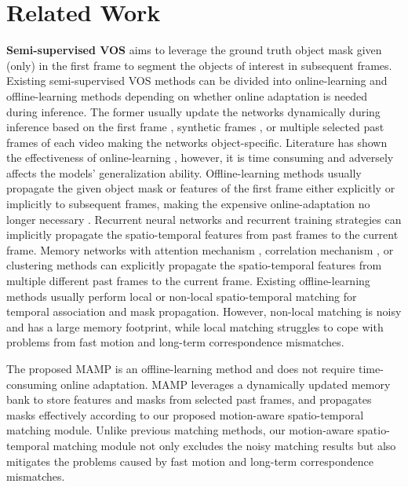 \documentclass[letterpaper]{article} \usepackage{aaai22}  \usepackage{times}  \usepackage{helvet}  \usepackage{courier}  \usepackage[hyphens]{url}  \usepackage{graphicx} \urlstyle{rm} \def\UrlFont{\rm}  \usepackage{natbib}  \usepackage{caption} \DeclareCaptionStyle{ruled}{labelfont=normalfont,labelsep=colon,strut=off} \frenchspacing  \setlength{\pdfpagewidth}{8.5in}  \setlength{\pdfpageheight}{11in}  \usepackage{algorithm}
\begin{document}
\section{Related Work}

{\noindent\textbf{Semi-supervised VOS} aims to leverage the ground truth object mask given (only) in the first frame to segment the objects of interest in subsequent frames. Existing semi-supervised VOS methods can be divided into online-learning and offline-learning methods depending on whether online adaptation is needed during inference. The former usually update the networks dynamically during inference based on the first frame \cite{OSVOS,OSVOS_S,MaskTrack,TAN_DTTM}, synthetic frames \cite{Lucid,PReMVOS}, or multiple selected past frames \cite{OnAVOS,e_osvos} of each video making the networks object-specific. Literature has shown the effectiveness of online-learning \cite{Ranet}, however, it is time consuming and adversely affects the models' generalization ability. Offline-learning methods usually propagate the given object mask or features of the first frame either explicitly or implicitly to subsequent frames, making the expensive online-adaptation no longer necessary \cite{OSMN,SiamMask}. Recurrent neural networks \cite{RVOS,DyeNet} and recurrent training strategies \cite{RGMP} can implicitly propagate the spatio-temporal features from past frames to the current frame. Memory networks with attention mechanism \cite{STM,AFB_URR,GC,KMN,rmnet}, correlation mechanism \cite{Videomatch,FEELVOS,CFBI,MAST}, or clustering methods \cite{PML} can explicitly propagate the spatio-temporal features from multiple different past frames to the current frame. Existing offline-learning methods usually perform local or non-local spatio-temporal matching for temporal association and mask propagation. However, non-local matching is noisy and has a large memory footprint, while local matching struggles to cope with problems from fast motion and long-term correspondence mismatches.}

The proposed MAMP is an offline-learning method and does not require time-consuming online adaptation. MAMP leverages a dynamically updated memory bank to store features and masks from selected past frames, and propagates masks effectively according to our proposed motion-aware spatio-temporal matching module. Unlike previous matching methods, our motion-aware spatio-temporal matching module not only excludes the noisy matching results but also mitigates the problems caused by fast motion and long-term correspondence mismatches.
\end{document}
